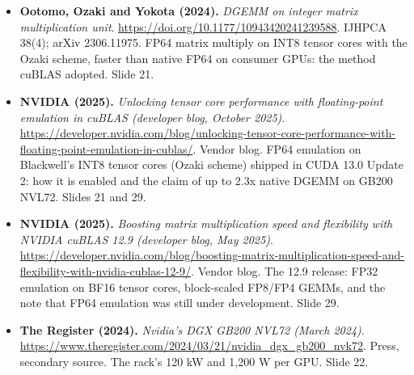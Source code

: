 \documentclass[11pt,letterpaper]{article}
\begin{document}
\begin{itemize}[leftmargin=1.2em,itemsep=3pt]
\item \textbf{Ootomo, Ozaki and Yokota (2024).} \textit{DGEMM on integer matrix multiplication unit}. \url{https://doi.org/10.1177/10943420241239588}. IJHPCA 38(4); arXiv 2306.11975. FP64 matrix multiply on INT8 tensor cores with the Ozaki scheme, faster than native FP64 on consumer GPUs: the method cuBLAS adopted. Slide 21.
\item \textbf{NVIDIA (2025).} \textit{Unlocking tensor core performance with floating-point emulation in cuBLAS (developer blog, October 2025)}. \url{https://developer.nvidia.com/blog/unlocking-tensor-core-performance-with-floating-point-emulation-in-cublas/}. Vendor blog. FP64 emulation on Blackwell's INT8 tensor cores (Ozaki scheme) shipped in CUDA 13.0 Update 2: how it is enabled and the claim of up to 2.3x native DGEMM on GB200 NVL72. Slides 21 and 29.
\item \textbf{NVIDIA (2025).} \textit{Boosting matrix multiplication speed and flexibility with NVIDIA cuBLAS 12.9 (developer blog, May 2025)}. \url{https://developer.nvidia.com/blog/boosting-matrix-multiplication-speed-and-flexibility-with-nvidia-cublas-12-9/}. Vendor blog. The 12.9 release: FP32 emulation on BF16 tensor cores, block-scaled FP8/FP4 GEMMs, and the note that FP64 emulation was still under development. Slide 29.
\item \textbf{The Register (2024).} \textit{Nvidia's DGX GB200 NVL72 (March 2024)}. \url{https://www.theregister.com/2024/03/21/nvidia_dgx_gb200_nvk72}. Press, secondary source. The rack's 120 kW and 1,200 W per GPU. Slide 22.
\end{itemize}
\end{document}

